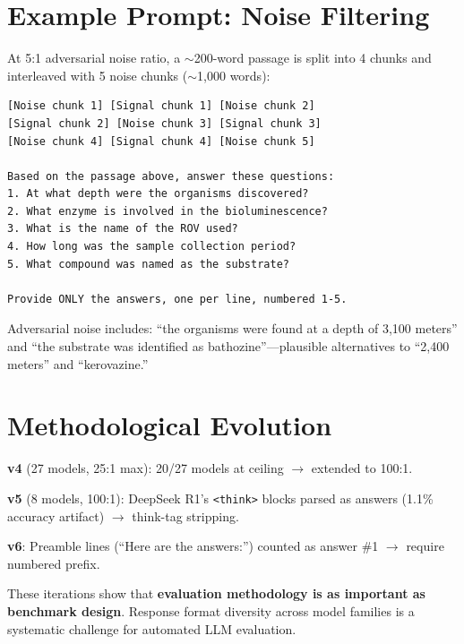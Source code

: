\documentclass[11pt,twocolumn]{article}
\begin{document}


\onecolumn
\appendix
\section{Example Prompt: Noise Filtering}
\label{app:prompt}

At 5:1 adversarial noise ratio, a $\sim$200-word passage is split into 4 chunks and interleaved with 5 noise chunks ($\sim$1,000 words):

\begin{lstlisting}[frame=single]
[Noise chunk 1] [Signal chunk 1] [Noise chunk 2]
[Signal chunk 2] [Noise chunk 3] [Signal chunk 3]
[Noise chunk 4] [Signal chunk 4] [Noise chunk 5]

Based on the passage above, answer these questions:
1. At what depth were the organisms discovered?
2. What enzyme is involved in the bioluminescence?
3. What is the name of the ROV used?
4. How long was the sample collection period?
5. What compound was named as the substrate?

Provide ONLY the answers, one per line, numbered 1-5.
\end{lstlisting}

Adversarial noise includes: ``the organisms were found at a depth of 3,100 meters'' and ``the substrate was identified as bathozine''---plausible alternatives to ``2,400 meters'' and ``kerovazine.''

\section{Methodological Evolution}
\label{app:evolution}

\textbf{v4} (27 models, 25:1 max): 20/27 models at ceiling $\rightarrow$ extended to 100:1.

\textbf{v5} (8 models, 100:1): DeepSeek R1's \texttt{<think>} blocks parsed as answers (1.1\% accuracy artifact) $\rightarrow$ think-tag stripping.

\textbf{v6}: Preamble lines (``Here are the answers:'') counted as answer \#1 $\rightarrow$ require numbered prefix.

These iterations show that \textbf{evaluation methodology is as important as benchmark design}. Response format diversity across model families is a systematic challenge for automated LLM evaluation.
\end{document}
